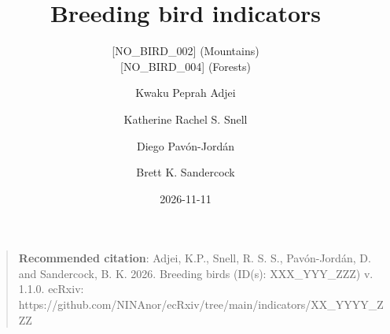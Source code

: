 \documentclass[
  letterpaper,
  DIV=11,
  numbers=noendperiod]{scrartcl}
\title{Breeding bird indicators}
\subtitle{{[}NO\_BIRD\_002{]} (Mountains)\\
{[}NO\_BIRD\_004{]} (Forests)}
\author{Kwaku Peprah Adjei \and Katherine Rachel S. Snell \and Diego
Pavón-Jordán \and Brett K. Sandercock}
\date{2026-11-11}
\begin{document}
\maketitle


\begin{figure}

\begin{minipage}[t]{0.17\linewidth}

\end{minipage}%
%
\begin{minipage}[t]{0.17\linewidth}

\end{minipage}%
%
\begin{minipage}[t]{0.17\linewidth}

\end{minipage}%
%
\begin{minipage}[t]{0.17\linewidth}

\end{minipage}%
%
\begin{minipage}[t]{0.17\linewidth}

\end{minipage}%
%
\begin{minipage}[t]{0.17\linewidth}

\end{minipage}%

\end{figure}%

\begin{quote}
\textbf{Recommended citation}: Adjei, K.P., Snell, R. S. S.,
Pavón-Jordán, D. and Sandercock, B. K. 2026. Breeding birds (ID(s):
XXX\_YYY\_ZZZ) v. 1.1.0. ecRxiv:
https://github.com/NINAnor/ecRxiv/tree/main/indicators/XX\_YYYY\_ZZZ
\end{quote}
\end{document}
